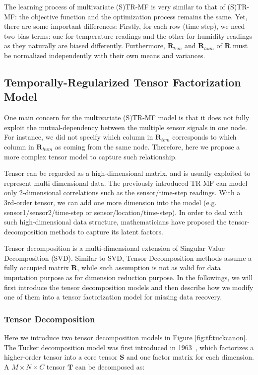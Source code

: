 The learning process of multivariate (S)TR-MF is very similar to that of (S)TR-MF: the objective function and the optimization process remains the same. Yet, there are some important differences: 
Firstly, for each row (time step), we need two bias terms: one for temperature readings and the other for humidity readings as they naturally are biased differently. Furthermore, $\mathbf{R}_{tem}$ and $\mathbf{R}_{hum}$ of $\mathbf{R}$ must be normalized independently with their own means and variances. 

 
\subsection{Temporally-Regularized Tensor Factorization Model} \label{sec:tensordecomp}

One main concern for the multivariate (S)TR-MF model is that it does not fully exploit the mutual-dependency between the multiple sensor signals in one node. For instance, we did not specify which column in $\mathbf{R}_{tem}$ corresponds to which column in $\mathbf{R}_{hum}$ as coming from the same node. Therefore, here we propose a more complex tensor model to capture such relationship. 

Tensor can be regarded as a high-dimensional matrix, and is usually exploited to represent multi-dimensional data. The previously introduced TR-MF can model only 2-dimensional correlations such as the sensor/time-step readings. With a 3rd-order tensor, we can add one more dimension into the model (e.g. sensor1/sensor2/time-step or sensor/location/time-step). In order to deal with such high-dimensional data structure, mathematicians have proposed the tensor-decomposition methods to capture its latent factors. 

Tensor decomposition is a multi-dimensional extension of Singular Value Decomposition (SVD). Similar to SVD, Tensor Decomposition methods assume a fully occupied matrix $\mathbf{R}$, while such assumption is not as valid for data imputation purpose as for dimension reduction purpose.
In the followings, we will first introduce the tensor decomposition models and then describe how we modify one of them into a tensor factorization model for missing data recovery. 

 
\subsubsection{Tensor Decomposition}
Here we introduce two tensor decomposition models in Figure \ref{fig:tf:tuckcanon}. The Tucker decomposition model was first introduced in 1963~\cite{tucker1963implications}, which factorizes a higher-order tensor into a core tensor $\mathbf{S}$ and one factor matrix for each dimension.
A $M\times N \times C $ tensor $\mathbf{T}$ can be decomposed as:

